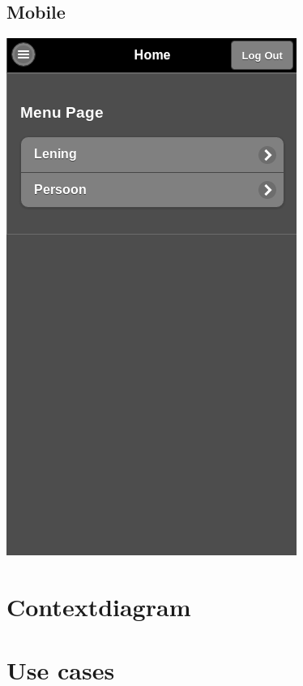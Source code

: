 \documentclass[11pt,english]{article}
\begin{document}
	\subsection{Mobile}
	\includegraphics[scale=0.5]{scrot-mobile}

	\newpage
	\section{Contextdiagram}

	\newpage
	\section{Use cases}
\end{document}
